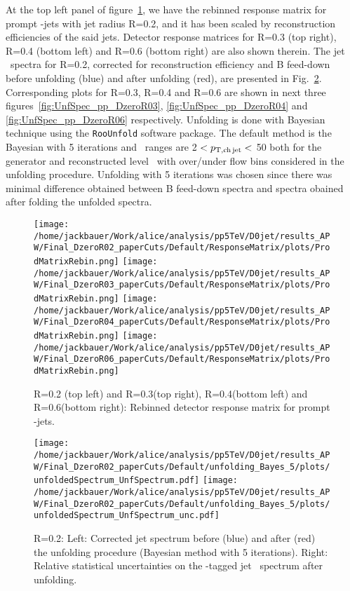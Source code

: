 At the top left panel of figure~\ref{fig:pp_ResponseMatrix_DzeroR02R03R04R06}, we have the rebinned response matrix for prompt \Dzero-jets with jet radius R=0.2, and it has been scaled by reconstruction efficiencies of the said jets. Detector response matrices for R=0.3 (top right), R=0.4 (bottom left) and R=0.6 (bottom right) are also shown therein.
The jet \pt\ spectra for R=0.2, corrected for reconstruction efficiency and B feed-down before unfolding (blue) and after unfolding (red), are presented in Fig.~\ref{fig:UnfSpec_pp_DzeroR02}. Corresponding plots for R=0.3, R=0.4 and R=0.6 are shown in next three figures~\ref{fig:UnfSpec_pp_DzeroR03}, \ref{fig:UnfSpec_pp_DzeroR04} and \ref{fig:UnfSpec_pp_DzeroR06} respectively.
Unfolding is done with Bayesian technique using the \texttt{RooUnfold} software package. The default method is the Bayesian with 5 iterations and \ptchjet\ ranges are 2 $< p_{\mathrm{T,ch\, jet}}< $ 50 both for the generator and reconstructed level \pt\, with over/under flow bins considered in the unfolding procedure. Unfolding with 5 iterations was chosen since there was minimal difference obtained between B feed-down spectra and spectra obained after folding the unfolded spectra.
\begin{figure}[bth]
\centering
\texttt{[image: /home/jackbauer/Work/alice/analysis/pp5TeV/D0jet/results\_APW/Final\_DzeroR02\_paperCuts/Default/ResponseMatrix/plots/ProdMatrixRebin.png]}
\texttt{[image: /home/jackbauer/Work/alice/analysis/pp5TeV/D0jet/results\_APW/Final\_DzeroR03\_paperCuts/Default/ResponseMatrix/plots/ProdMatrixRebin.png]}
\texttt{[image: /home/jackbauer/Work/alice/analysis/pp5TeV/D0jet/results\_APW/Final\_DzeroR04\_paperCuts/Default/ResponseMatrix/plots/ProdMatrixRebin.png]}
\texttt{[image: /home/jackbauer/Work/alice/analysis/pp5TeV/D0jet/results\_APW/Final\_DzeroR06\_paperCuts/Default/ResponseMatrix/plots/ProdMatrixRebin.png]}
\caption{R=0.2 (top left) and R=0.3(top right), R=0.4(bottom left) and R=0.6(bottom right): Rebinned detector response matrix for prompt \Dzero-jets.}
\label{fig:pp_ResponseMatrix_DzeroR02R03R04R06}
\end{figure}
\begin{figure}[bth]
\centering
\texttt{[image: /home/jackbauer/Work/alice/analysis/pp5TeV/D0jet/results\_APW/Final\_DzeroR02\_paperCuts/Default/unfolding\_Bayes\_5/plots/unfoldedSpectrum\_UnfSpectrum.pdf]}
\texttt{[image: /home/jackbauer/Work/alice/analysis/pp5TeV/D0jet/results\_APW/Final\_DzeroR02\_paperCuts/Default/unfolding\_Bayes\_5/plots/unfoldedSpectrum\_UnfSpectrum\_unc.pdf]}
\caption{R=0.2: Left: Corrected jet \pt spectrum before (blue) and after (red) the unfolding procedure (Bayesian method with 5 iterations). Right: Relative statistical uncertainties on the \Dzero-tagged jet \pt\ spectrum after unfolding.}
\label{fig:UnfSpec_pp_DzeroR02}
\end{figure}
